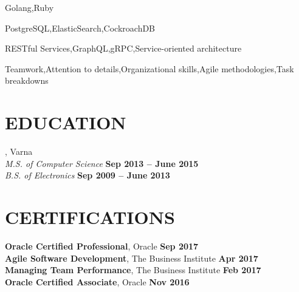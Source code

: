 \documentclass[margin,line]{resume}
\begin{document}
\begin{resume}
\begin{list2}
  \item Golang,\hspace{2mm}Ruby\@
  \item PostgreSQL,\hspace{2mm}ElasticSearch,\hspace{2mm}CockroachDB\@
  \item RESTful Services,\hspace{2mm}GraphQL,\hspace{2mm}gRPC,\hspace{2mm}Service-oriented architecture\@
  \item Teamwork,\hspace{2mm}Attention to details,\hspace{2mm}Organizational skills,\hspace{2mm}Agile methodologies,\hspace{2mm}Task breakdowns\@
\end{list2}

\sectionline%

\section{\mysidestyle\textbf{\large{E}\small{DUCATION}}}

\textbf{}, Varna \vspace{2mm}\\\vspace{1mm}%
\textsl{M.S. of Computer Science} \hfill \textbf{ Sep 2013 {--} June 2015}\\
\textsl{B.S. of Electronics} \hfill \textbf{ Sep 2009 {--} June 2013}\\

\sectionline%

\section{\mysidestyle\textbf{\large{C}\small{ERTIFICATIONS}}}

\textbf{Oracle Certified Professional}, Oracle \hfill \textbf{Sep 2017} \vspace{2mm}\\\vspace{1mm}%
\textbf{Agile Software Development}, The Business Institute \hfill \textbf{Apr 2017} \vspace{2mm}\\\vspace{1mm}%
\textbf{Managing Team Performance}, The Business Institute \hfill \textbf{Feb 2017} \vspace{2mm}\\\vspace{1mm}%
\textbf{Oracle Certified Associate}, Oracle \hfill \textbf{Nov 2016} \vspace{2mm}\\\vspace{1mm}%

\end{resume}
\end{document}
